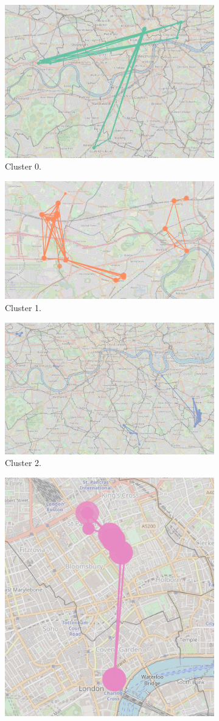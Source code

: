 \documentclass{article}
\theoremstyle{remark}
\begin{document}
\begin{figure}[!h]

\centering
\begin{subfigure}{0.6\textheight}
\centering
\includegraphics[width=0.4\linewidth]{figures/weekday_locals_c0.png}
\caption{Cluster 0.}
\label{fig:weekday_locals_c0}
\end{subfigure}
\begin{subfigure}{0.6\textheight}
\centering
\includegraphics[width=0.4\linewidth]{figures/weekday_locals_c1.png}
\caption{Cluster 1.}
\label{fig:weekday_locals_c1}
\end{subfigure}
\begin{subfigure}{0.6\textheight}
\centering
\includegraphics[width=0.4\linewidth]{figures/weekday_locals_c2.png}
\caption{Cluster 2.}
\label{fig:weekday_locals_c2}
\end{subfigure}
\begin{subfigure}{0.6\textheight}
\centering
\includegraphics[width=0.4\linewidth]{figures/weekday_locals_c3.png}

\end{subfigure}
\end{figure}
\end{document}
